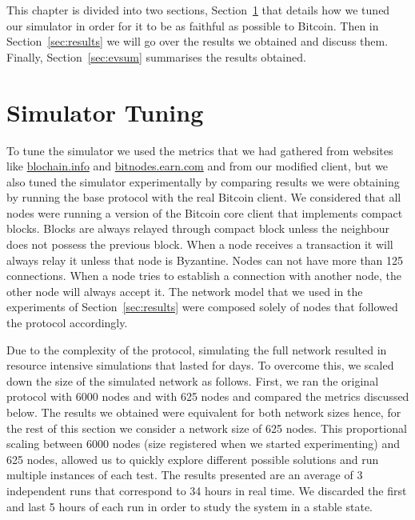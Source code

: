 This chapter is divided into two sections, Section~\ref{sec:sim_tuning} that details how we tuned our simulator in order for it to be as faithful as possible to Bitcoin. Then in Section~\ref{sec:results} we will go over the results we obtained and discuss them. Finally, Section~\ref{sec:evsum} summarises the results obtained.

\section{Simulator Tuning}
\label{sec:sim_tuning}
To tune the simulator we used the metrics that we had gathered from websites like \url{blochain.info} and \url{bitnodes.earn.com} and from our modified client, but we also tuned the simulator experimentally by comparing results we were obtaining by running the base protocol with the real Bitcoin client. We considered that all nodes were running a version of the Bitcoin core client that implements compact blocks. Blocks are always relayed through compact block unless the neighbour does not possess the previous block. When a node receives a transaction it will always relay it unless that node is Byzantine. Nodes can not have more than 125 connections. When a node tries to establish a connection with another node, the other node will always accept it. The network model that we used in the experiments of Section~\ref{sec:results} were composed solely of nodes that followed the protocol accordingly.

Due to the complexity of the protocol, simulating the full network resulted in resource intensive simulations that lasted for days.
To overcome this, we scaled down the size of the simulated network as follows.
First, we ran the original protocol with 6000 nodes and with 625 nodes and compared the metrics discussed below. The results we obtained were equivalent for both network sizes hence, for the rest of this section we consider a network size of 625 nodes. This proportional scaling between 6000 nodes (size registered when we started experimenting) and 625 nodes, allowed us to quickly explore different possible solutions and run multiple instances of each test. The results presented are an average of 3 independent runs that correspond to 34 hours in real time. We discarded the first and last 5 hours of each run in order to study the system in a stable state. 

